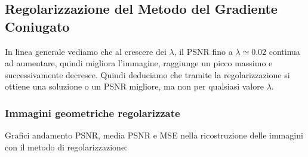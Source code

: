 {\color{ggreen}\subsection{Regolarizzazione del Metodo del Gradiente Coniugato }}
In linea generale vediamo che al crescere dei $\lambda$, il PSNR fino a $\lambda \simeq 0.02$ 
continua ad aumentare, 
quindi migliora l'immagine, raggiunge un picco massimo e successivamente decresce.
Quindi deduciamo che tramite la regolarizzazione si ottiene una soluzione o un PSNR migliore, ma non per 
qualsiasi valore $\lambda$. 

{\color{ggreen}\subsubsection{Immagini geometriche regolarizzate}}
Grafici andamento PSNR, media PSNR e MSE nella ricostruzione delle immagini con il metodo di regolarizzazione:

